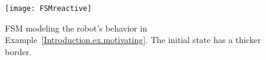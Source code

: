 %
%
\begin{landscape}
 \begin{figure}
\texttt{[image: FSMreactive]} 
   \caption{FSM modeling the robot's behavior in Example~\ref{Introduction.ex.motivating}. The initial state has a thicker border.}
    \label{Introduction.fig.FSMreactive}
 \end{figure}
\end{landscape}
